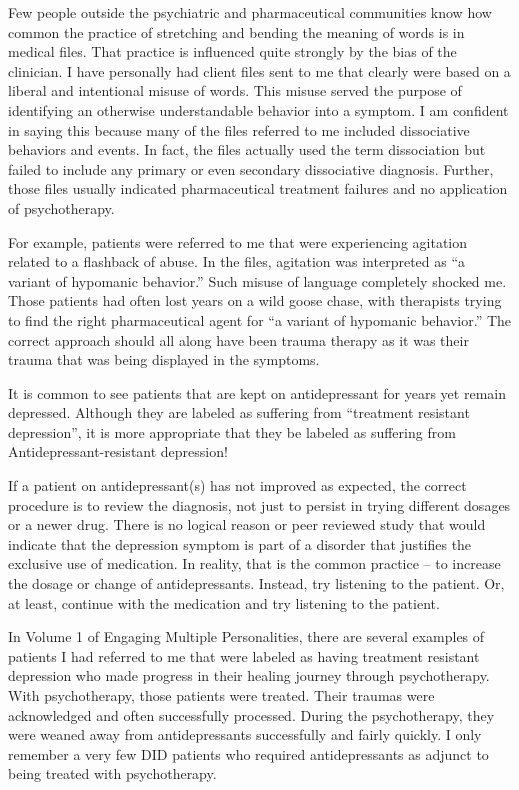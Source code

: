 \documentclass[]{book}
\begin{document}
Few people outside the psychiatric and pharmaceutical communities know how common the practice of stretching and bending the meaning of words is in medical files. That practice is influenced quite strongly by the bias of the clinician. I have personally had client files sent to me that clearly were based on a liberal and intentional misuse of words. This misuse served the purpose of identifying an otherwise understandable behavior into a symptom. I am confident in saying this because many of the files referred to me included dissociative behaviors and events. In fact, the files actually used the term dissociation but failed to include any primary or even secondary dissociative diagnosis. Further, those files usually indicated pharmaceutical treatment failures and no application of psychotherapy.

For example, patients were referred to me that were experiencing agitation related to a flashback of abuse. In the files, agitation was interpreted as ``a variant of hypomanic behavior.'' Such misuse of language completely shocked me. Those patients had often lost years on a wild goose chase, with therapists trying to find the right pharmaceutical agent for ``a variant of hypomanic behavior.'' The correct approach should all along have been trauma therapy as it was their trauma that was being displayed in the symptoms.

It is common to see patients that are kept on antidepressant for years yet remain depressed. Although they are labeled as suffering from ``treatment resistant depression'', it is more appropriate that they be labeled as suffering from Antidepressant-resistant depression!

If a patient on antidepressant(s) has not improved as expected, the correct procedure is to review the diagnosis, not just to persist in trying different dosages or a newer drug. There is no logical reason or peer reviewed study that would indicate that the depression symptom is part of a disorder that justifies the exclusive use of medication. In reality, that is the common practice -- to increase the dosage or change of antidepressants. Instead, try listening to the patient. Or, at least, continue with the medication and try listening to the patient.

In Volume 1 of Engaging Multiple Personalities, there are several examples of patients I had referred to me that were labeled as having treatment resistant depression who made progress in their healing journey through psychotherapy. With psychotherapy, those patients were treated. Their traumas were acknowledged and often successfully processed. During the psychotherapy, they were weaned away from antidepressants successfully and fairly quickly. I only remember a very few DID patients who required antidepressants as adjunct to being treated with psychotherapy.
\end{document}
